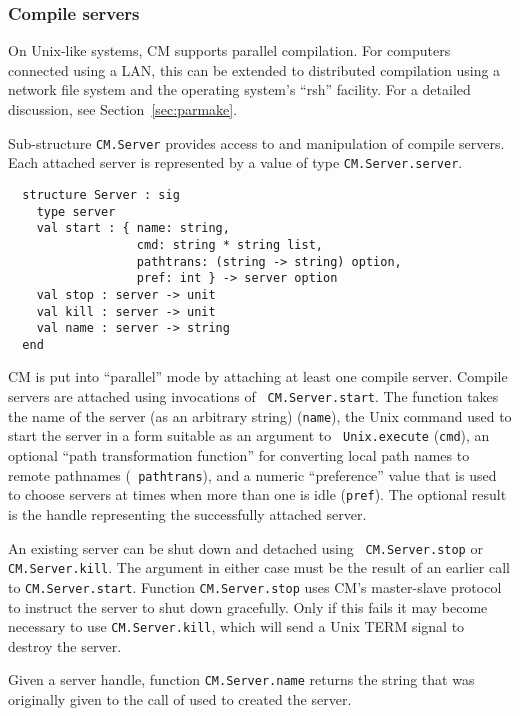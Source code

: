 \documentclass[titlepage,letterpaper]{article}
\begin{document}
\subsubsection{Compile servers}

On Unix-like systems, CM supports parallel compilation.  For computers
connected using a LAN, this can be extended to distributed compilation
using a network file system and the operating system's ``rsh''
facility.  For a detailed discussion, see Section~\ref{sec:parmake}.

Sub-structure {\tt CM.Server} provides access to and manipulation of
compile servers.  Each attached server is represented by a value of
type {\tt CM.Server.server}.

\begin{verbatim}
  structure Server : sig
    type server
    val start : { name: string,
                  cmd: string * string list,
                  pathtrans: (string -> string) option,
                  pref: int } -> server option
    val stop : server -> unit
    val kill : server -> unit
    val name : server -> string
  end
\end{verbatim}

CM is put into ``parallel'' mode by attaching at least one compile
server.  Compile servers are attached using invocations of {\tt
CM.Server.start}.  The function takes the name of the server (as an
arbitrary string) ({\tt name}), the Unix command used to
start the server in a form suitable as an argument to {\tt
Unix.execute} ({\tt cmd}), an optional ``path transformation
function'' for converting local path names to remote pathnames ({\tt
pathtrans}), and a numeric ``preference'' value that is used to choose
servers at times when more than one is idle ({\tt pref}).  The
optional result is the handle representing the successfully attached
server.

An existing server can be shut down and detached using {\tt
CM.Server.stop} or {\tt CM.Server.kill}.  The argument in either case
must be the result of an earlier call to {\tt CM.Server.start}.
Function {\tt CM.Server.stop} uses CM's master-slave protocol to
instruct the server to shut down gracefully.  Only if this fails it
may become necessary to use {\tt CM.Server.kill}, which will send a
Unix TERM signal to destroy the server.

Given a server handle, function {\tt CM.Server.name} returns the
string that was originally given to the call of used to created the server.
\end{document}
